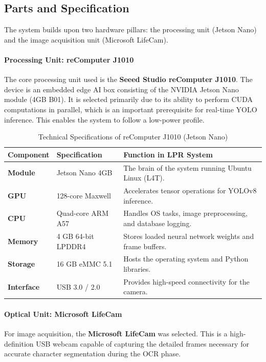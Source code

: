 \subsection{Parts and Specification}

The system builds upon two hardware pillars: the processing unit (Jetson Nano) and the image acquisition unit (Microsoft LifeCam).

\paragraph{Processing Unit: reComputer J1010}
The core processing unit used is the \textbf{Seeed Studio reComputer J1010}. The device is an embedded edge AI box consisting of the NVIDIA Jetson Nano module (4GB B01). It is selected primarily due to its ability to perform CUDA computations in parallel, which is an important prerequisite for real-time YOLO inference. This enables the system to follow a low-power profile.  

\begin{table}[h]
	\centering
	\caption{Technical Specifications of reComputer J1010 (Jetson Nano) \cite{Stu23a}}
	\label{tab:jetson_specs}
	\begin{tabular}{@{}llp{6.5cm}@{}}
		\toprule
		\textbf{Component} & \textbf{Specification} & \textbf{Function in LPR System} \\ \midrule
		\textbf{Module} & Jetson Nano 4GB & The brain of the system running Ubuntu Linux (L4T). \\
		\textbf{GPU} & 128-core Maxwell & Accelerates tensor operations for YOLOv8 inference. \\
		\textbf{CPU} & Quad-core ARM A57 & Handles OS tasks, image preprocessing, and database logging. \\
		\textbf{Memory} & 4 GB 64-bit LPDDR4 & Stores loaded neural network weights and frame buffers. \\
		\textbf{Storage} & 16 GB eMMC 5.1 & Hosts the operating system and Python libraries. \\
		\textbf{Interface} & USB 3.0 / 2.0 & Provides high-speed connectivity for the camera. \\ 
		\bottomrule
	\end{tabular}
\end{table}

\paragraph{Optical Unit: Microsoft LifeCam}
For image acquisition, the \textbf{Microsoft LifeCam} was selected. This is a high-definition USB webcam capable of capturing the detailed frames necessary for accurate character segmentation during the OCR phase.

